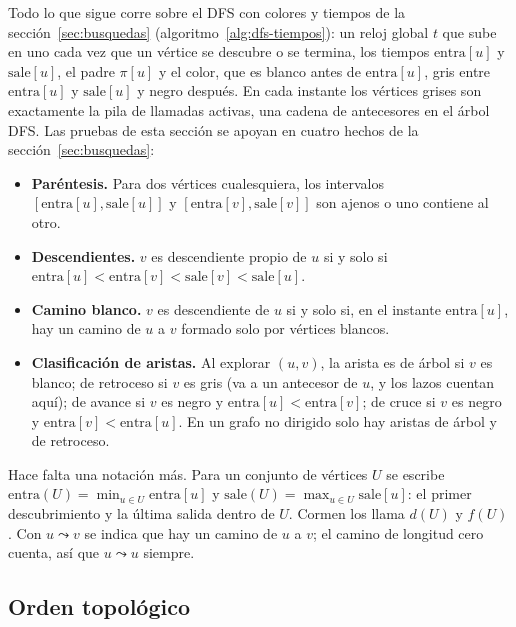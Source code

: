 \documentclass[11pt,letterpaper]{article}
\begin{document}
Todo lo que sigue corre sobre el DFS con colores y tiempos de la
sección~\ref{sec:busquedas} (algoritmo~\ref{alg:dfs-tiempos}): un reloj
global $t$ que sube en uno cada vez que un vértice se descubre o se
termina, los tiempos $\text{entra}[u]$ y $\text{sale}[u]$, el padre
$\pi[u]$ y el color, que es blanco antes de $\text{entra}[u]$, gris
entre $\text{entra}[u]$ y $\text{sale}[u]$ y negro después. En cada
instante los vértices grises son exactamente la pila de llamadas
activas, una cadena de antecesores en el árbol DFS. Las pruebas de esta
sección se apoyan en cuatro hechos de la sección~\ref{sec:busquedas}:

\begin{itemize}[itemsep=0.1em]
  \item \textbf{Paréntesis.} Para dos vértices cualesquiera, los
        intervalos $[\text{entra}[u], \text{sale}[u]]$ y
        $[\text{entra}[v], \text{sale}[v]]$ son ajenos o uno contiene
        al otro.
  \item \textbf{Descendientes.} $v$ es descendiente propio de $u$ si y
        solo si $\text{entra}[u] < \text{entra}[v] < \text{sale}[v] <
        \text{sale}[u]$.
  \item \textbf{Camino blanco.} $v$ es descendiente de $u$ si y solo
        si, en el instante $\text{entra}[u]$, hay un camino de $u$ a
        $v$ formado solo por vértices blancos.
  \item \textbf{Clasificación de aristas.} Al explorar $(u, v)$, la
        arista es de árbol si $v$ es blanco; de retroceso si $v$ es
        gris (va a un antecesor de $u$, y los lazos cuentan aquí); de
        avance si $v$ es negro y $\text{entra}[u] < \text{entra}[v]$;
        de cruce si $v$ es negro y $\text{entra}[v] <
        \text{entra}[u]$. En un grafo no dirigido solo hay aristas de
        árbol y de retroceso.
\end{itemize}

Hace falta una notación más. Para un conjunto de vértices $U$ se
escribe $\text{entra}(U) = \min_{u \in U} \text{entra}[u]$ y
$\text{sale}(U) = \max_{u \in U} \text{sale}[u]$: el primer
descubrimiento y la última salida dentro de $U$. Cormen los llama
$d(U)$ y $f(U)$. Con $u \leadsto v$ se indica que hay un camino de $u$
a $v$; el camino de longitud cero cuenta, así que $u \leadsto u$
siempre.


\subsection*{Orden topológico}
\end{document}
